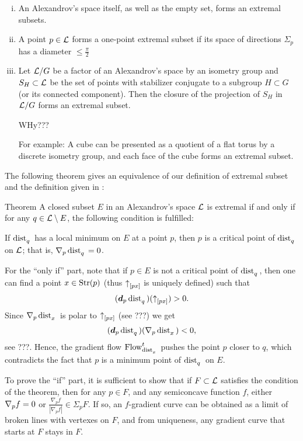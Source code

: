 \begin{enumerate}[(i)]
\item An Alexandrov's space itself, as well as the empty set, forms an extremal subsets.
\item A point $p\in \spc{L}$ forms a one-point extremal subset if its
space of directions $\Sigma_p$ has a diameter $\le\tfrac\pi2$

\item 
Let $\mathcal{L}/G$ be a factor of an Alexandrov's space by an isometry group and $S_H\subset \spc{L}$ be the set of points with stabilizer conjugate to a subgroup $H\subset G$ (or its connected component). 
Then the closure of the projection of $S_H$ in $\mathcal{L}/G$ forms an extremal subset.

WHy???

For example: A cube can be presented as a quotient of a flat torus by a discrete isometry group, and each face of the cube forms an extremal subset.

\end{enumerate}


\noi The following theorem gives an equivalence of our definition of extremal subset and the definition given in
\cite{perelman-petrunin:extremal}:

\begin{thm}{Theorem}\label{thm:dist-extr}  A closed subset $E$ in
an Alexandrov's space $\mathcal{L}$ is extremal if and only if for any $q\in \spc{L}\setminus E$,
the following condition is fulfilled:

If $\mathop{\rm dist}\nolimits_{q}^{{}}{}{}$ has a local minimum on $E$ at a point $p$, then $p$ is a critical
point of $\mathop{\rm dist}\nolimits_{q}^{{}}{}{}$ on $\mathcal{L}$; 
that is, $\nabla_p\mathop{\rm dist}\nolimits_{q}^{{}}{}{}=0$.
\end{thm}

 For the ``only if'' part, note that if $p\in E$ is not a critical point of
$\mathop{\rm dist}\nolimits_{q}^{{}}{}{}$, then one can find a point $x\in \Str(p)$ (thus ${\uparrow}_{[{p}{x}]}$ is
uniquely defined) such that 
\[(\bm{d}_p\mathop{\rm dist}\nolimits_{q}^{{}}{}{})({\uparrow}_{[{p}{x}]})>0.\] 
Since $\nabla_p\mathop{\rm dist}\nolimits_{x}^{{}}{}{}$ is polar to ${\uparrow}_{[{p}{x}]}$ (see
???) we get 
\[(\bm{d}_p\mathop{\rm dist}\nolimits_{q}^{{}}{}{})(\nabla_p\mathop{\rm dist}\nolimits_{x}^{{}}{}{})<0,\] 
see ???.
Hence, the gradient flow $\mathop{\rm Flow}\nolimits_{\mathop{\rm dist}\nolimits_{x}^{{}}{}{}}^t$ pushes the point $p$ closer to $q$, which
contradicts the fact that $p$ is a minimum point of $\mathop{\rm dist}\nolimits_{q}^{{}}{}{}$ on $E$.

To prove the ``if'' part, it is sufficient to show that if $F\subset \spc{L}$ satisfies the condition of the theorem,
then for any $p\in F$, and any semiconcave function $f$, either $\nabla_p f=0$ or 
$\tfrac{\nabla_p f}{|\nabla_p f|}\in \Sigma_p F$.
If so, an $f$-gradient curve
can be obtained as a limit of broken lines with vertexes on $F$, and from
uniqueness, any gradient curve that starts at $F$ stays in $F$.

